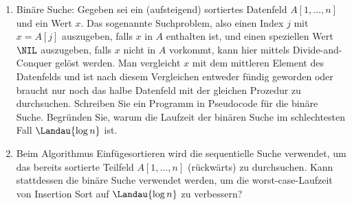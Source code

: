 
\begin{exercise}

\phantom{}

\begin{enumerate}[label = (\alph*)]

    \item Binäre Suche:
    Gegeben sei ein (aufsteigend) sortiertes Datenfeld $A[1, \ldots, n]$ und ein Wert $x$.
    Das sogenannte Suchproblem, also einen Index $j$ mit $x = A[j]$ auszugeben, falls $x$ in $A$ enthalten ist, und einen speziellen Wert $\NIL$ auszugeben, falls $x$ nicht in $A$ vorkommt, kann hier mittels Divide-and-Conquer gelöst werden.
    Man vergleicht $x$ mit dem mittleren Element des Datenfelds und ist nach diesem Vergleichen entweder fündig geworden oder braucht nur noch das halbe Datenfeld mit der gleichen Prozedur zu durchsuchen.
    Schreiben Sie ein Programm in Pseudocode für die binäre Suche.
    Begründen Sie, warum die Laufzeit der binären Suche im schlechtesten Fall $\Landau{\log{n}}$ ist.

    \item Beim Algorithmus Einfügesortieren wird die sequentielle Suche verwendet, um das bereits sortierte Teilfeld $A[1, \ldots, n]$ (rückwärts) zu durchsuchen.
    Kann stattdessen die binäre Suche verwendet werden, um die worst-case-Laufzeit von Insertion Sort auf $\Landau{\log{n}}$ zu verbessern?

\end{enumerate}

\end{exercise}


